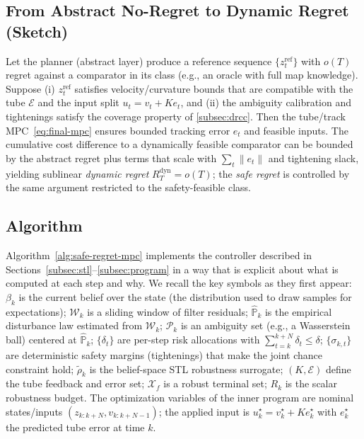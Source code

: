 \documentclass[journal]{IEEEtran}
\theoremstyle{definition}
\begin{document}
\subsection{From Abstract No-Regret to Dynamic Regret (Sketch)}
\label{subsec:regret}
Let the planner (abstract layer) produce a reference sequence $\{z_t^{\text{ref}}\}$ with $o(T)$ regret
against a comparator in its class (e.g., an oracle with full map knowledge). Suppose
(i) $z_t^{\text{ref}}$ satisfies velocity/curvature bounds that are compatible with the tube $\mathcal{E}$ and
the input split $u_t=v_t+Ke_t$, and (ii) the ambiguity calibration and tightenings satisfy the coverage property
of \ref{subsec:drcc}. Then the tube/track MPC~\eqref{eq:final-mpc} ensures bounded tracking error $e_t$ and
feasible inputs. The cumulative cost difference to a dynamically feasible comparator can be bounded by the
abstract regret plus terms that scale with $\sum_t\|e_t\|$ and tightening slack, yielding sublinear
\emph{dynamic regret} $R_T^{\text{dyn}}=o(T)$; the \emph{safe regret} is controlled by the same argument
restricted to the safety-feasible class.


 
 \subsection{Algorithm}
\label{subsec:algorithm}

Algorithm~\ref{alg:safe-regret-mpc} implements the controller described in
Sections~\ref{subsec:stl}--\ref{subsec:program} in a way that is explicit about
what is computed at each step and why. We recall the key symbols as they first appear:
$\beta_k$ is the current belief over the state (the distribution used to draw
samples for expectations); $\mathcal{W}_k$ is a sliding window of filter residuals; 
$\widehat{\mathbb{P}}_k$ is the empirical disturbance law estimated from $\mathcal{W}_k$;
$\mathcal{P}_k$ is an ambiguity set (e.g., a Wasserstein ball) centered at $\widehat{\mathbb{P}}_k$;
$\{\delta_t\}$ are per-step risk allocations with $\sum_{t=k}^{k+N}\delta_t\le\delta$;
$\{\sigma_{k,t}\}$ are deterministic safety margins (tightenings) that make the joint chance
constraint hold; $\widetilde{\rho}_k$ is the belief-space STL robustness surrogate; 
$(K,\mathcal{E})$ define the tube feedback and error set; $\mathcal{X}_f$ is a robust
terminal set; $R_k$ is the scalar robustness budget. The optimization variables of the inner
program are nominal states/inputs $(z_{k:k+N},v_{k:k+N-1})$; the applied input is
$u_k^\star=v_k^\star+K e_k^\star$ with $e_k^\star$ the predicted tube error at time $k$.
\end{document}
